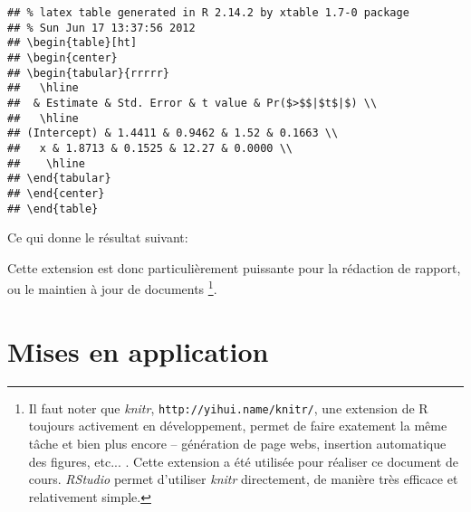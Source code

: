 \begin{knitrout}
\color{fgcolor}\begin{kframe}
\begin{flushleft}
\ttfamily\noindent
{}\hlkeyword{(}\hlkeyword{)}\mbox{}
\normalfont
\end{flushleft}
\begin{verbatim}
## % latex table generated in R 2.14.2 by xtable 1.7-0 package
## % Sun Jun 17 13:37:56 2012
## \begin{table}[ht]
## \begin{center}
## \begin{tabular}{rrrrr}
##   \hline
##  & Estimate & Std. Error & t value & Pr($>$$|$t$|$) \\ 
##   \hline
## (Intercept) & 1.4411 & 0.9462 & 1.52 & 0.1663 \\ 
##   x & 1.8713 & 0.1525 & 12.27 & 0.0000 \\ 
##    \hline
## \end{tabular}
## \end{center}
## \end{table}
\end{verbatim}
\begin{flushleft}
\ttfamily\noindent
{}\hlkeyword{(}\hlkeyword{,}{\ }\hlargument{=}{\ }\hlkeyword{)}\mbox{}
\normalfont
\end{flushleft}
\end{kframe}
\end{knitrout}


Ce qui donne le résultat suivant:






Cette extension est donc particulièrement puissante pour la rédaction de rapport, ou le maintien à jour de documents \footnote{Il faut noter que \emph{knitr}, \texttt{http://yihui.name/knitr/}, une extension de R toujours activement en développement, permet de faire exatement la même tâche et bien plus encore -- génération de page webs, insertion automatique des figures, etc... . Cette extension a été utilisée pour réaliser ce document de cours. \emph{RStudio} permet d'utiliser \emph{knitr} directement, de manière très efficace et relativement simple.}.

\section{Mises en application}

